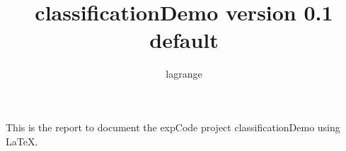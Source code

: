 \documentclass[10pt,a4paper,fleqn]{article}
\title{classificationDemo version 0.1\\ default}
\author{ lagrange }
\begin{document}
 
  
\maketitle 
  
  
This is the report to document the expCode project classificationDemo using \LaTeX. 
  
  
  
% 
% 
  
\end{document}
